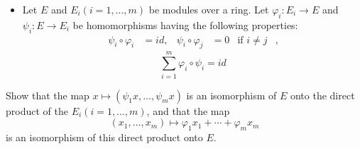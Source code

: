 \documentclass{article}
\begin{document}
\begin{itemize}
        \item Let $E$ and $E_{i}(i = 1, \ldots, m)$ be modules over a ring. Let $\varphi_{i} : E_{i} \rightarrow E$ and $\psi_{i}: E \rightarrow E_{i}$ be homomorphisms having the following properties:
            \begin{align*}
                \psi_{i} \circ \varphi_{i} &= id, & \psi_{i} \circ \varphi_{j} &= 0 & \text{if } i \neq j  &,    
            \end{align*}
            \begin{equation*}
                \sum_{i = 1}^{m}  \varphi_{i} \circ \psi_{i} = id
            \end{equation*}
    \end{itemize}
Show that the map $x \mapsto (\psi_{1}x, \ldots, \psi_{m}x)$ is an isomorphism of $E$ onto the direct product of the $E_{i}(i = 1, \ldots, m)$, and that the map
    \begin{equation*}
        (x_{1}, \ldots, x_{m}) \mapsto \varphi_{1}x_{1} + \cdots + \varphi_{m} x_{m}
    \end{equation*}
is an isomorphism of this direct product onto $E$. 
\end{document}
